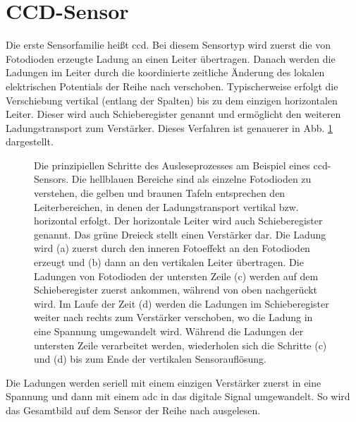 \section{CCD-Sensor}
\label{text:ccd_theorie}
Die erste Sensorfamilie heißt \gls{ccd}. Bei diesem Sensortyp wird zuerst die von Fotodioden erzeugte Ladung an einen Leiter übertragen. Danach werden die Ladungen im Leiter durch die koordinierte zeitliche Änderung des lokalen elektrischen Potentials der Reihe nach verschoben. Typischerweise erfolgt die Verschiebung vertikal (entlang der Spalten) bis zu dem einzigen horizontalen Leiter. Dieser wird auch Schieberegister genannt und ermöglicht den weiteren Ladungstransport zum Verstärker. Dieses Verfahren ist genauerer in Abb. \ref{fig:ccd_scheme} dargestellt.
\begin{figure}[H]
    
    \caption{Die prinzipiellen Schritte des Ausleseprozesses am Beispiel eines  \gls{ccd}-Sensors. Die hellblauen Bereiche sind als einzelne Fotodioden zu verstehen, die gelben und braunen Tafeln entsprechen den Leiterbereichen, in denen der Ladungstransport vertikal bzw. horizontal erfolgt. Der horizontale Leiter wird auch Schieberegister genannt. Das grüne Dreieck stellt einen Verstärker dar. Die Ladung wird (a) zuerst durch den inneren Fotoeffekt an den Fotodioden erzeugt und (b) dann an den vertikalen Leiter übertragen. Die Ladungen von Fotodioden der untersten Zeile (c) werden auf dem Schieberegister zuerst ankommen, während von oben nachgerückt wird. Im Laufe der Zeit (d) werden die Ladungen im Schieberegister weiter nach rechts zum Verstärker verschoben, wo die Ladung in eine Spannung umgewandelt wird. Während die Ladungen der untersten Zeile verarbeitet werden, wiederholen sich die Schritte (c) und (d) bis zum Ende der vertikalen Sensorauflösung.}
    \label{fig:ccd_scheme}
\end{figure}
\noindent
Die Ladungen werden seriell mit einem einzigen Verstärker zuerst in eine Spannung und dann mit einem \gls{adc} in das digitale Signal umgewandelt. So wird das Gesamtbild auf dem Sensor der Reihe nach ausgelesen.

